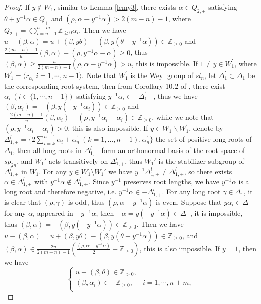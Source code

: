 \documentclass[12pt]{article}
\begin{document}
\begin{proof}
If $y\notin W_1$, similar to Lemma \ref{lemy3}, there exists $\alpha\in Q_{2,+}$ satisfying $\theta+y^{-1}\alpha\in Q_+$ and $(\rho,\alpha-y^{-1}\alpha)>2(m-n)-1$, where $Q_{2,+}=\bigoplus_{i=n+1}^{n+m}\mathbb{Z}_{\geq0}\alpha_i$.
Then we have $u-(\beta,\alpha)=u+(\beta,y\theta)-(\beta,y(\theta+y^{-1}\alpha))\in\mathbb{Z}_{\geq0}$ and $\frac{2(m-n)-1}{u}(\beta,\alpha)+(\rho,y^{-1}\alpha-\alpha)\geq0$, thus $(\beta,\alpha)\geq\frac{u}{2(m-n)-1}(\rho,\alpha-y^{-1}\alpha)>u$,
this is impossible.
If $1\ne y\in W_1^\prime$, where $W_1^\prime=\langle r_{\alpha_i}|i=1,\cdots,n-1\rangle$.
Note that $W_1^\prime$ is the Weyl group of $sl_{n}$, let $\Delta_1^\prime\subset\Delta_1$ be the corresponding root system,
then from Corollary 10.2 of \cite{Hum78}, there exist $\alpha_i ~(i\in\{1,\cdots,n-1\})$ satisfying $y^{-1}\alpha_i\in -\Delta_{1,+}^\prime$,
thus we have $(\beta,\alpha_i)=-(\beta,y(-y^{-1}\alpha_i))\in\mathbb{Z}_{\geq0}$ and $-\frac{2(m-n)-1}{u}(\beta,\alpha_i)-(\rho,y^{-1}\alpha_i-\alpha_i)\in \mathbb{Z}_{\geq0}$,
while we note that $(\rho,y^{-1}\alpha_i-\alpha_i)>0$, this is also impossible.
If $y\in W_1\backslash W_1^\prime$,
denote by \(\Delta_{1,+}^l=\{ 2\sum_{i=k}^{n-1} \alpha_i + \alpha_n^\prime ~(k=1, \dots, n-1), \alpha_n^\prime\}\)
the set of positive long roots of $\Delta_1$, then all long roots in \(\Delta_{1,+}^l\)
form an orthonormal basis of the root space of $sp_{2n}$,
and \(W_1'\) acts transitively on \(\Delta_{1,+}^l\), thus
$W_1' $ is the stabilizer subgroup of $\Delta_{1,+}^l$ in $W_1$.
For any \(y \in W_1\setminus W_1'\) we have \(y^{-1}\Delta_{1,+}^l \neq \Delta_{1,+}^l\),
so there exists \(\alpha \in \Delta_{1,+}^l\) with \(y^{-1}\alpha \notin \Delta_{1,+}^l\).
Since \(y^{-1}\) preserves root lengths, we have \(y^{-1}\alpha\) is a long root and therefore negative, i.e. \(y^{-1}\alpha \in -\Delta_{1,+}^l\).
For any long root $\gamma\in \Delta_1$, it is clear that $(\rho, \gamma)$ is odd, thus $(\rho,\alpha-y^{-1}\alpha)$ is even.
Suppose that $y\alpha_i\in \Delta_+$ for any $\alpha_i$ appeared in $-y^{-1}\alpha$,
then $-\alpha=y(-y^{-1}\alpha)\in \Delta_+$, it is impossible, thus $(\beta, \alpha)=-(\beta,y(-y^{-1}\alpha))\in \mathbb{Z}_{>0}$.
Then we have $u-(\beta,\alpha)=u+(\beta,y\theta)-(\beta,y(\theta+y^{-1}\alpha))\in\mathbb{Z}_{\geq0}$,
and $(\beta,\alpha)\in \frac{2u}{2(m-n)-1}(\frac{(\rho,\alpha-y^{-1}\alpha)}{2}-\mathbb{Z}_{\geq0})$, this is also impossible.
If $y=1$, then we have
$$\begin{cases}
u+(\beta,\theta)\in\mathbb{Z}_{>0},\\
(\beta,\alpha_i)\in-\mathbb{Z}_{\geq0},&i=1,\cdots,n+m,\\

\end{cases}$$
\end{proof}
\end{document}
